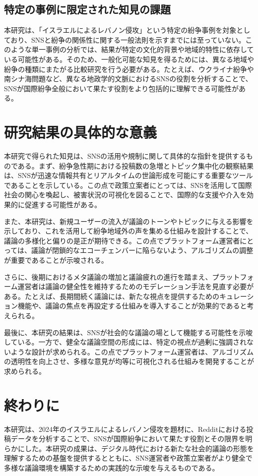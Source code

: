 \documentclass[11pt, a4j]{jreport}
\begin{document}
    \subsection{特定の事例に限定された知見の課題}
    本研究は、「イスラエルによるレバノン侵攻」という特定の紛争事例を対象としており、SNSと紛争の関係性に関する一般法則を示すまでには至っていない。このような単一事例の分析では、結果が特定の文化的背景や地域的特性に依存している可能性がある。そのため、一般化可能な知見を得るためには、異なる地域や紛争の種類にまたがる比較研究を行う必要がある。たとえば、ウクライナ紛争や南シナ海問題など、異なる地政学的文脈におけるSNSの役割を分析することで、SNSが国際紛争全般において果たす役割をより包括的に理解できる可能性がある。

    \section{研究結果の具体的な意義}
    本研究で得られた知見は、SNSの活用や規制に関して具体的な指針を提供するものである。まず、紛争急性期における投稿数の急増とトピック集中化の観察結果は、SNSが迅速な情報共有とリアルタイムの世論形成を可能にする重要なツールであることを示している。この点で政策立案者にとっては、SNSを活用して国際社会の関心を喚起し、被害状況の可視化を図ることで、国際的な支援や介入を効果的に促進する可能性がある。
    
    また、本研究は、新規ユーザーの流入が議論のトーンやトピックに与える影響を示しており、これを活用して紛争地域外の声を集める仕組みを設計することで、議論の多様化と偏りの是正が期待できる。この点でプラットフォーム運営者にとっては、議論が閉鎖的なエコーチェンバーに陥らないよう、アルゴリズムの調整が重要であることが示唆される。
    
    さらに、後期におけるメタ議論の増加と議論疲れの進行を踏まえ、プラットフォーム運営者は議論の健全性を維持するためのモデレーション手法を見直す必要がある。たとえば、長期間続く議論には、新たな視点を提供するためのキュレーション機能や、議論の焦点を再設定する仕組みを導入することが効果的であると考えられる。
    
    最後に、本研究の結果は、SNSが社会的な議論の場として機能する可能性を示唆している。一方で、健全な議論空間の形成には、特定の視点が過剰に強調されないような設計が求められる。この点でプラットフォーム運営者は、アルゴリズムの透明性を向上させ、多様な意見が均等に可視化される仕組みを開発することが求められる。
    
    \section{終わりに}
    本研究は、2024年のイスラエルによるレバノン侵攻を題材に、Redditにおける投稿データを分析することで、SNSが国際紛争において果たす役割とその限界を明らかにした。本研究の成果は、デジタル時代における新たな社会的議論の形態を理解するための基盤を提供するとともに、SNS運営者や政策立案者がより健全で多様な議論環境を構築するための実践的な示唆を与えるものである。
\end{document}
